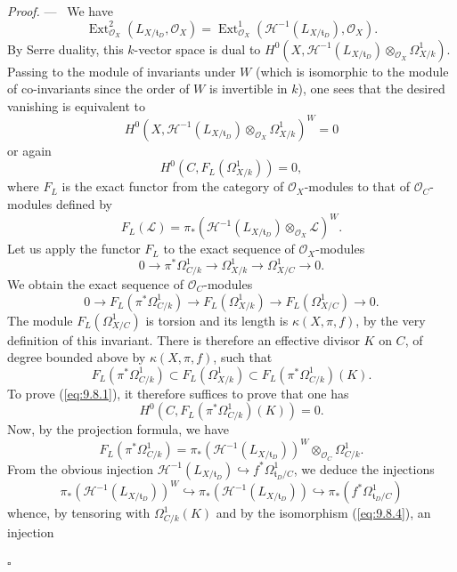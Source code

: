 \documentclass[12pt,a4paper,oneside,english,leqno]{smfart}
\numberwithin{equation}{subsection}
\numberwithin{theo}{subsection}
\theoremstyle{plain}
\theoremstyle{definition}
\theoremstyle{remark}
\newenvironment{preuve}[1][]{\medskip\noindent\textit{Proof.} #1 ---\ }%
  {\hfill\ensuremath{\square}\medskip}
\DeclareMathOperator{\Ext}{Ext}
\newcommand{\oc}{\mathcal{O}}
\newcommand{\lc}{\mathcal{L}}
\newcommand{\hc}{\mathcal{H}}
\newcommand{\tgo}{\mathfrak{t}}
\begin{document}
\begin{preuve}
We have
\[
\Ext^2_{\oc_X}(L_{X/\tgo_D},\oc_X)=\Ext^1_{\oc_X}(\hc^{-1}(L_{X/\tgo_D}),\oc_X).
\]
By Serre duality, this $k$-vector space is dual to $H^0(X,\hc^{-1}(L_{X/\tgo_D})\otimes_{\oc_X}\Omega^1_{X/k})$. Passing to the module of invariants under $W$ (which is isomorphic to the module of co-invariants since the order of $W$ is invertible in $k$), one sees that the desired vanishing is equivalent to
\[
H^0(X,\hc^{-1}(L_{X/\tgo_D})\otimes_{\oc_X}\Omega^1_{X/k})^W=0
\]
or again
\begin{equation}\label{eq:9.8.1}
H^0(C,F_L(\Omega^1_{X/k}))=0,
\end{equation}
where $F_L$ is the exact functor from the category of $\oc_X$-modules to that of $\oc_C$-modules defined by
\[
F_L(\lc)=\pi_*(\hc^{-1}(L_{X/\tgo_D})\otimes_{\oc_X}\lc)^W.
\]
Let us apply the functor $F_L$ to the exact sequence of $\oc_X$-modules
\begin{equation}\label{eq:9.8.2}
0\longrightarrow\pi^*\Omega^1_{C/k}\longrightarrow\Omega^1_{X/k}\longrightarrow\Omega^1_{X/C}\longrightarrow 0.
\end{equation}
We obtain the exact sequence of $\oc_C$-modules
\[
0\longrightarrow F_L(\pi^*\Omega^1_{C/k})\longrightarrow F_L(\Omega^1_{X/k})\longrightarrow F_L(\Omega^1_{X/C})\longrightarrow 0.
\]
The module $F_L(\Omega^1_{X/C})$ is torsion and its length is $\kappa(X,\pi,f)$, by the very definition of this invariant. There is therefore an effective divisor $K$ on $C$, of degree bounded above by $\kappa(X,\pi,f)$, such that
\[
F_L(\pi^*\Omega^1_{C/k})\subset F_L(\Omega^1_{X/k})\subset F_L(\pi^*\Omega^1_{C/k})(K).
\]
To prove (\ref{eq:9.8.1}), it therefore suffices to prove that one has
\begin{equation}\label{eq:9.8.3}
H^0(C,F_L(\pi^*\Omega^1_{C/k})(K))=0.
\end{equation}
Now, by the projection formula, we have
\begin{equation}\label{eq:9.8.4}
F_L(\pi^*\Omega^1_{C/k})=\pi_*(\hc^{-1}(L_{X/\tgo_D}))^W\otimes_{\oc_C}\Omega^1_{C/k}.
\end{equation}
From the obvious injection $\hc^{-1}(L_{X/\tgo_D})\hookrightarrow f^*\Omega^1_{\tgo_D/C}$, we deduce the injections
\begin{equation}\label{eq:9.8.5}
\pi_*(\hc^{-1}(L_{X/\tgo_D}))^W\hookrightarrow\pi_*(\hc^{-1}(L_{X/\tgo_D}))\hookrightarrow\pi_*(f^*\Omega^1_{\tgo_D/C})
\end{equation}
whence, by tensoring with $\Omega^1_{C/k}(K)$ and by the isomorphism (\ref{eq:9.8.4}), an injection

\end{preuve}
\end{document}
